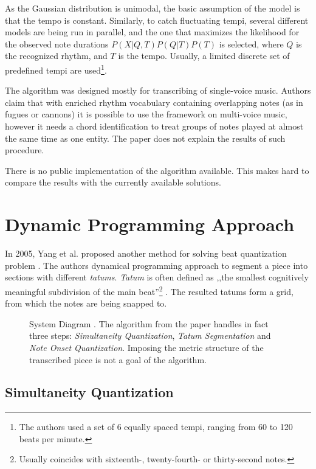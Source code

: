 As the Gaussian distribution is unimodal, the basic assumption of the model is that the tempo is constant. Similarly, to catch fluctuating tempi, several different models are being run in parallel, and the one that maximizes the likelihood for the observed note durations $P(X|Q,T)P(Q|T)P(T)$ is selected, where $Q$ is the recognized rhythm, and $T$ is the tempo. Usually, a limited discrete set of predefined tempi are used\footnote{The authors used a set of 6 equally spaced tempi, ranging from 60 to 120 beats per minute.}.

The algorithm was designed mostly for transcribing of single-voice music. Authors claim that with enriched rhythm vocabulary containing overlapping notes (as in fugues or cannons) it is possible to use the framework on multi-voice music, however it needs a chord identification to treat groups of notes played at almost the same time as one entity. The paper does not explain the results of such procedure.

There is no public implementation of the algorithm available. This makes hard to compare the results with the currently available solutions.

\section{Dynamic Programming Approach}

In 2005, Yang et al. proposed another method for solving beat quantization problem \cite{Yang2005}. The authors dynamical programming approach to segment a piece into sections with different \emph{tatums}. \emph{Tatum} is often defined as ,,the smallest cognitively meaningful
subdivision of the main beat''\footnote{Usually coincides with sixteenth-, twenty-fourth- or thirty-second notes.} \cite{Iyer1997}. The resulted tatums form a grid, from which the notes are being snapped to.

\begin{figure}[!ht]
\centering

\caption[System Diagram]{System Diagram \cite{Yang2005}. The algorithm from the paper handles in fact three steps: \emph{Simultaneity Quantization}, \emph{Tatum Segmentation} and \emph{Note Onset Quantization}. Imposing the metric structure of the transcribed piece is not a goal of the algorithm.}
\end{figure}

\subsection{Simultaneity Quantization}

